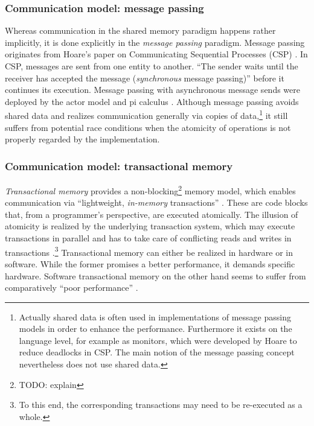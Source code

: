 \subsubsection{Communication model: message passing}
Whereas communication in the shared memory paradigm happens rather implicitly, it is done explicitly in the \textit{message passing} paradigm. Message passing originates from Hoare's paper on Communicating Sequential Processes (CSP) \cite{CommunicatingSequentialProcesses}. In CSP, messages are sent from one entity to another. ``The sender waits until the receiver has accepted the message (\textit{synchronous} message passing)'' \cite[p.~138]{DistributedSharedMemory} before it continues its execution. Message passing with asynchronous message sends were deployed by the actor model \cite{UniversalModularACTORFormalism} and pi calculus \cite{ThePolyadicPi-Calculus}. Although message passing avoids shared data and realizes communication generally via copies of data,\footnote{Actually shared data is often used in implementations of message passing models in order to enhance the performance. Furthermore it exists on the language level, for example as monitors, which were developed by Hoare to reduce deadlocks in CSP. The main notion of the message passing concept nevertheless does not use shared data.} it still suffers from potential race conditions \cite{DebuggingRaceConditions} when the atomicity of operations is not properly regarded by the implementation.

\subsubsection{Communication model: transactional memory}
\textit{Transactional memory} provides a non-blocking\footnote{TODO: explain} memory model, which enables communication via ``lightweight, \textit{in-memory} transactions'' \cite[p.~3]{PrinciplesOfTransactionalMemory}. These are code blocks that, from a programmer's perspective, are executed atomically. The illusion of atomicity is realized by the underlying transaction system, which may execute transactions in parallel and has to take care of conflicting reads and writes in transactions \cite{TransactionalMemory}.\footnote{To this end, the corresponding transactions may need to be re-executed as a whole.} Transactional memory can either be realized in hardware or in software. While the former promises a better performance, it demands specific hardware. Software transactional memory on the other hand seems to suffer from comparatively ``poor performance'' \cite[p.~13]{TransactionalProgrammabilityAndPerformance}.

